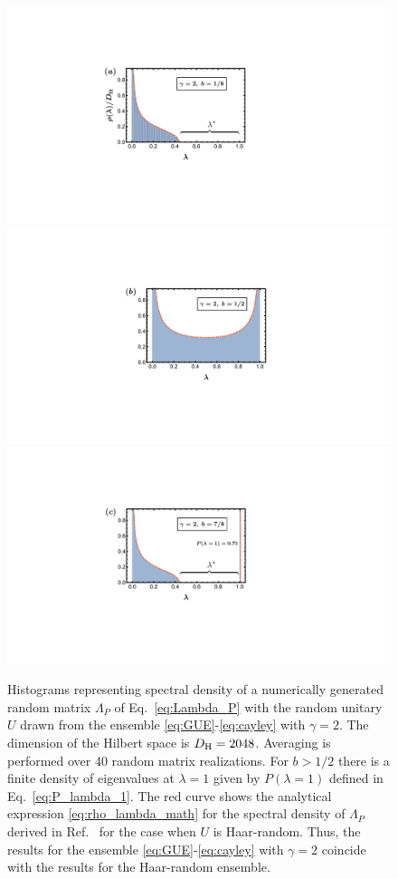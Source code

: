 \documentclass[%
 reprint,
 superscriptaddress,
 amsmath,amssymb,
prx,
]{revtex4-2}\href{\href{}{}}{}
\begin{document}
\begin{figure}[t]
	\includegraphics[width = 0.63\columnwidth]{lam_W_distr_gamma2_b18_gap.pdf}\qquad
	\includegraphics[width = 0.63\columnwidth]{lam_W_distr_gamma2_b12_gap.pdf}\qquad
	\includegraphics[width = 0.63\columnwidth]{lam_W_distr_gamma2_b78_gap.pdf}
	\caption{Histograms representing spectral density of a numerically generated random matrix $\Lambda_P$ of Eq.~\eqref{eq:Lambda_P} with the random unitary $U$ drawn from the ensemble \eqref{eq:GUE}-\eqref{eq:cayley} with $\gamma=2$. The dimension of the Hilbert space is $D_{\rm H}=2048$. Averaging is performed over 40 random matrix realizations. For $b>1/2$ there is a finite density of eigenvalues at $\lambda=1$ given by $P(\lambda=1)$ defined in Eq.~\eqref{eq:P_lambda_1}. The red curve shows the analytical expression \eqref{eq:rho_lambda_math} for the spectral density of $\Lambda_P$ derived in Ref.~\cite{Collins2005} for the case when $U$ is Haar-random. Thus, the results for the ensemble \eqref{eq:GUE}-\eqref{eq:cayley} with $\gamma=2$ coincide with the results for the Haar-random ensemble.
	}
	\label{fig:W_eval_hist}
\end{figure}
\end{document}
